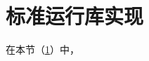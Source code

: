 \section{标准运行库实现}\label{sec:StandardRuntimeLibraryImplementation}

在本节（\cref{sec:StandardRuntimeLibraryImplementation}）中，